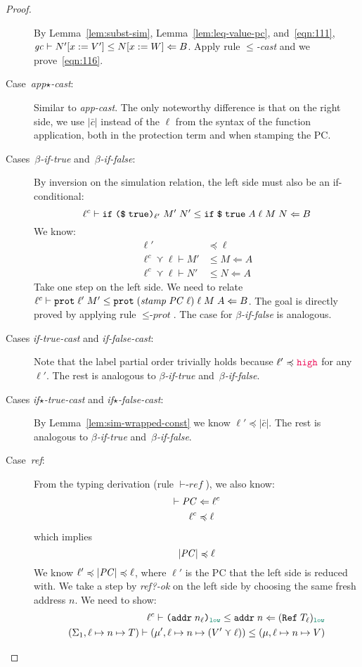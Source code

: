 \begin{proof}
\begin{description}
      By Lemma~\ref{lem:subst-sim}, Lemma~\ref{lem:leq-value-pc}, and~\eqref{eqn:111},
      ${\mathit{gc}}\vdash{N'[x:=V']}\leq{N[x:=W]}\Leftarrow{B}$.
      Apply rule ${\leq}$\textit{-cast} and we prove~\eqref{eqn:116}.
  \item[Case~\textit{app$\star$-cast}:] Similar to \textit{app-cast}.
  The only noteworthy difference is that on the right side, we use $|\bar{c}|$ instead of the
  $\ell$ from the syntax of the function application, both in the protection term
  and when stamping the PC.
  \item[Cases~$\beta$\textit{-if-true} and~$\beta$\textit{-if-false}:]
  By inversion on the simulation relation, the left side must also
  be an if-conditional:
  \[
  {\ell^c}\vdash{\ensuremath{\text{\texttt{{if}}}\;{\text{\texttt{{(\$}}}\;{\mathtt{true}}\text{\texttt{{)}}}_{\ell'}}\;{M'}\;{N'}}}\leq{\ensuremath{\text{\texttt{{if}}}\;{\text{\texttt{{\$}}}\;{\mathtt{true}}}\;{A}\;{\ell}\;{M}\;{N}}}\Leftarrow{B}
  \]
  We know:
  \begin{align}
  \ell' &\preccurlyeq \ell \\
  \ell^c \curlyvee \ell \vdash M' &\leq M \Leftarrow A \\
  \ell^c \curlyvee \ell \vdash N' &\leq N \Leftarrow A
  \end{align}
  Take one step on the left side. We need to relate
  ${\ell^c}\vdash{\ensuremath{\text{\texttt{{prot}}}\;{\ell'}\;{M'}}}\leq{\ensuremath{\text{\texttt{{prot}}}\;{(\mathit{stamp}\;\mathit{PC}\;\ell)}\;{\ell}\;{M}\;{A}}}\Leftarrow{B}$.
  The goal is directly proved by applying rule ${\leq}\textit{-prot}$.
  The case for $\beta$\textit{-if-false} is analogous.
  \item[Cases \textit{if-true-cast} and \textit{if-false-cast}:]
  Note that the label partial order trivially holds because $\ell' \preccurlyeq \high$
  for any $\ell'$. The rest is analogous to $\beta$\textit{-if-true} and~$\beta$\textit{-if-false}.
  \item[Cases \textit{if$\star$-true-cast} and \textit{if$\star$-false-cast}:]
  By Lemma~\ref{lem:sim-wrapped-const} we know $\ell' \preccurlyeq |\bar{c}|$.
  The rest is analogous to $\beta$\textit{-if-true} and~$\beta$\textit{-if-false}.
  \item[Case~\textit{ref}:]
  From the typing derivation (rule ${\vdash}\textit{-ref}$), we also know:
  \begin{align}
  \vdash \mathit{PC} &\Leftarrow \ell^c \\
  \ell^c &\preccurlyeq \ell
  \end{align}
  which implies
  \begin{equation}
  |\mathit{PC}| \preccurlyeq \ell
  \end{equation}
  We know $\ell' \preccurlyeq |\mathit{PC}| \preccurlyeq \ell$, where $\ell'$ is the PC that the left side is reduced with.
  We take a step by \textit{ref?-ok} on the left side by choosing the same fresh address $n$. We need to show:
  \begin{align}
  \simrel{\ell^c}{\dynaddr{n_\ell}{\low}}{\ccaddr{n}}{(\Refer{T_\ell})_{\low}}  \label{eqn:120} \\
  (\Sigma_1, \ell \mapsto n \mapsto T) \vdash (\mu', \ell \mapsto n \mapsto (V' \curlyvee \ell)) \leq (\mu, \ell \mapsto n \mapsto V)  \label{eqn:121}
  \end{align}


\end{description}
\end{proof}
